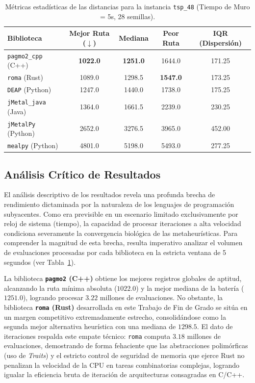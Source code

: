 \documentclass[12pt,a4paper,twoside,openright]{book}
\begin{document}
\begin{table}[htbp]
\centering
\small
\begin{tabular}{l ccc c}
\toprule
\textbf{Biblioteca} & \textbf{Mejor Ruta ($\downarrow$)} & \textbf{Mediana} & \textbf{Peor Ruta} & \textbf{IQR (Dispersión)} \\
\midrule
\texttt{pagmo2\_cpp} (C++)    & \textbf{1022.0} & \textbf{1251.0} & 1644.0 & 171.25 \\
\texttt{roma} (Rust)         & 1089.0 & 1298.5 & \textbf{1547.0} & 173.25 \\
\texttt{DEAP} (Python)        & 1247.0 & 1440.0 & 1738.0 & 175.25 \\
\texttt{jMetal\_java} (Java)  & 1364.0 & 1661.5 & 2239.0 & 230.25 \\
\texttt{jMetalPy} (Python)    & 2652.0 & 3276.5 & 3965.0 & 452.00 \\
\texttt{mealpy} (Python)      & 4801.0 & 5198.0 & 5493.0 & 277.25 \\
\bottomrule
\end{tabular}
\caption{Métricas estadísticas de las distancias para la instancia \texttt{tsp\_48} (Tiempo de Muro = 5s, 28 semillas).}
\label{tab:resultados_tsp}
\end{table}

\subsection{Análisis Crítico de Resultados}
    El análisis descriptivo de los resultados revela una profunda brecha de rendimiento dictaminada por la naturaleza de los lenguajes de programación subyacentes. Como era previsible en un escenario limitado exclusivamente por reloj de sistema (tiempo), la capacidad de procesar iteraciones a alta velocidad condiciona severamente la convergencia biológica de las metaheurísticas. Para comprender la magnitud de esta brecha, resulta imperativo analizar el volumen de evaluaciones procesadas por cada biblioteca en la estricta ventana de 5 segundos (ver Tabla~\ref{tab:resultados_tsp}).

    La biblioteca \textbf{\texttt{pagmo2} (C++)} obtiene los mejores registros globales de aptitud, alcanzando la ruta mínima absoluta ($1022.0$) y la mejor mediana de la batería ($1251.0$), logrando procesar $3.22$ millones de evaluaciones. No obstante, la biblioteca \textbf{\texttt{roma} (Rust)} desarrollada en este Trabajo de Fin de Grado se sitúa en un margen competitivo extremadamente estrecho, consolidándose como la segunda mejor alternativa heurística con una mediana de $1298.5$. El dato de iteraciones respalda este empate técnico: \texttt{roma} computa $3.18$ millones de evaluaciones, demostrando de forma fehaciente que las abstracciones polimórficas (uso de \textit{Traits}) y el estricto control de seguridad de memoria que ejerce Rust no penalizan la velocidad de la CPU en tareas combinatorias complejas, logrando igualar la eficiencia bruta de iteración de arquitecturas consagradas en C/C++.
\end{document}
